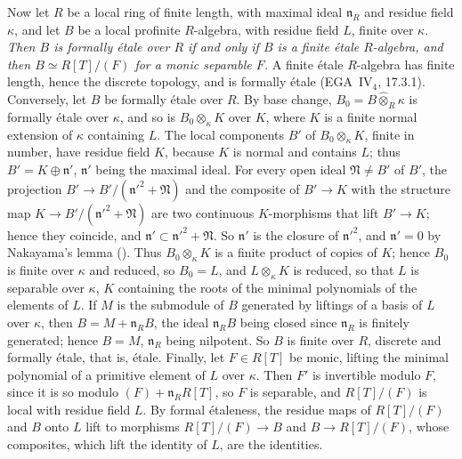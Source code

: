 Now let \(R\) be a local ring of finite length, with maximal ideal
\(\mathfrak n_R\) and residue field \(\kappa\), and let \(B\) be a
local profinite \(R\)-algebra, with residue field \(L\), finite over
\(\kappa\). \emph{Then \(B\) is formally étale over \(R\) if and only
if \(B\) is a finite étale \(R\)-algebra, and then
\(B\simeq R[T]/(F)\) for a monic separable \(F\).} A finite étale
\(R\)-algebra has finite length, hence the discrete topology, and is
formally étale \textup{(EGA~\(\mathrm{IV}_4\), 17.3.1)}. Conversely,
let \(B\) be formally étale over \(R\). By base change,
\(B_0=B\widehat\otimes_R\kappa\) is formally étale over \(\kappa\),
and so is \(B_0\otimes_\kappa K\) over \(K\), where \(K\) is a finite
normal extension of \(\kappa\) containing \(L\). The local components
\(B'\) of \(B_0\otimes_\kappa K\), finite in number, have residue
field \(K\), because \(K\) is normal and contains \(L\); thus
\(B'=K\oplus\mathfrak n'\), \(\mathfrak n'\) being the maximal ideal.
For every open ideal \(\mathfrak N\neq B'\) of \(B'\), the projection
\(B'\to B'/(\mathfrak n'^2+\mathfrak N)\) and the composite of
\(B'\to K\) with the structure map
\(K\to B'/(\mathfrak n'^2+\mathfrak N)\) are two continuous
\(K\)-morphisms that lift \(B'\to K\); hence they coincide, and
\(\mathfrak n'\subset\mathfrak n'^2+\mathfrak N\). So
\(\mathfrak n'\) is the closure of \(\mathfrak n'^2\), and
\(\mathfrak n'=0\) by Nakayama's lemma \textup{()}. Thus
\(B_0\otimes_\kappa K\) is a finite product of copies of \(K\); hence
\(B_0\) is finite over \(\kappa\) and reduced, so \(B_0=L\), and
\(L\otimes_\kappa K\) is reduced, so that \(L\) is separable over
\(\kappa\), \(K\) containing the roots of the minimal polynomials of
the elements of \(L\). If \(M\) is the submodule of \(B\) generated by
liftings of a basis of \(L\) over \(\kappa\), then
\(B=M+\mathfrak n_RB\), the ideal \(\mathfrak n_RB\) being closed since
\(\mathfrak n_R\) is finitely generated; hence \(B=M\), \(\mathfrak n_R\)
being nilpotent. So \(B\) is finite over \(R\), discrete and formally
étale, that is, étale. Finally, let \(F\in R[T]\) be monic, lifting the
minimal polynomial of a primitive element of \(L\) over \(\kappa\).
Then \(F'\) is invertible modulo \(F\), since it is so modulo
\((F)+\mathfrak n_RR[T]\), so \(F\) is separable, and \(R[T]/(F)\) is
local with residue field \(L\). By formal étaleness, the residue maps
of \(R[T]/(F)\) and \(B\) onto \(L\) lift to morphisms
\(R[T]/(F)\to B\) and \(B\to R[T]/(F)\), whose composites, which lift
the identity of \(L\), are the identities.
